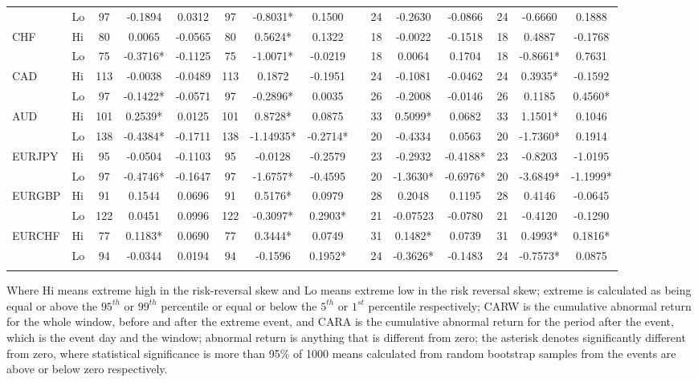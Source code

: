 \documentclass[ijfs,article,submit,oneauthor,pdftex,10pt,a4paper]{mdpi}
\begin{document}
\begin{sidewaystable}
\begin{threeparttable}
\begin{tabular}{llccccccccccccc}
& Lo & 97 &-0.1894 &0.0312 &97 &-0.8031* &0.1500 & &24 &-0.2630 &-0.0866 &24 &-0.6660 &0.1888  \\
\multirow{2}{*}{CHF}
& Hi & 80 &0.0065 &-0.0565 &80 &0.5624* &0.1322 & &18 & -0.0022 & -0.1518 &18 &0.4887 &-0.1768  \\ 
& Lo & 75 &-0.3716* & -0.1125& 75 &-1.0071* &-0.0219 & &18 &0.0064 &0.1704 &18 &-0.8661* &0.7631  \\
\multirow{2}{*}{CAD}
& Hi & 113 &-0.0038 &-0.0489 &113 &0.1872 &-0.1951 & & 24 &-0.1081 & -0.0462 &24 &0.3935* & -0.1592  \\ 
& Lo & 97 &-0.1422* & -0.0571 & 97 & -0.2896* & 0.0035& & 26 & -0.2008 & -0.0146 &26 &0.1185 & 0.4560*  \\
\multirow{2}{*}{AUD}
& Hi & 101 &0.2539* &0.0125 &101 &0.8728* & 0.0875 &  &33 &0.5099* &0.0682 &33 & 1.1501*& 0.1046  \\ 
& Lo & 138 &-0.4384* & -0.1711 & 138 & -1.14935* & -0.2714* & &20 &-0.4334 & 0.0563 &20  & -1.7360* & 0.1914  \\
\multirow{2}{*}{EURJPY}
& Hi & 95 &-0.0504 &-0.1103 &95 &-0.0128 &-0.2579 & &23 &-0.2932 &-0.4188* &23 &-0.8203 & -1.0195  \\ 
& Lo & 97 &-0.4746* & -0.1647 &97 &-1.6757* &-0.4595 & &20 &-1.3630* & -0.6976* & 20 & -3.6849* &-1.1999*  \\
\multirow{2}{*}{EURGBP}
& Hi & 91 & 0.1544 &0.0696 &91 &0.5176* &0.0979 & &28 &0.2048 &0.1195 &28 & 0.4146 & -0.0645  \\ 
& Lo & 122 & 0.0451 & 0.0996 &122 &-0.3097* &0.2903* & & 21 &-0.07523 &-0.0780 &21 & -0.4120 &
-0.1290  \\
\multirow{2}{*}{EURCHF}
& Hi & 77 & 0.1183* & 0.0690 &77 & 0.3444* & 0.0749& & 	31 & 0.1482* &0.0739  &31 & 0.4993* 
& 0.1816*  \\ 
& Lo & 94 &-0.0344 & 0.0194 & 94 & -0.1596 &0.1952* & &24 & -0.3626* &-0.1483 & 24 & -0.7573* 
& 0.0875  \\
\hline
\label{tabref:RR1}
\end{tabular}
\begin{tablenotes}
\small 
\item Where Hi means extreme high in the risk-reversal skew and Lo means extreme low in the risk reversal skew; extreme is calculated as being equal or above the $95^{th}$ or $99^{th}$ percentile or equal or below the $5^{th}$ or $1^{st}$ percentile respectively; CARW is the cumulative abnormal return for the whole window, before and after the extreme event, and CARA is the cumulative abnormal return for the period after the event, which is the event day and the window; abnormal return is anything that is different from zero; the asterisk denotes significantly different from zero, where statistical significance is more than 95\% of 1000 means calculated from random bootstrap samples from the events are above or below zero respectively.   
\end{tablenotes}
\end{threeparttable}  
\end{sidewaystable}
\end{document}
